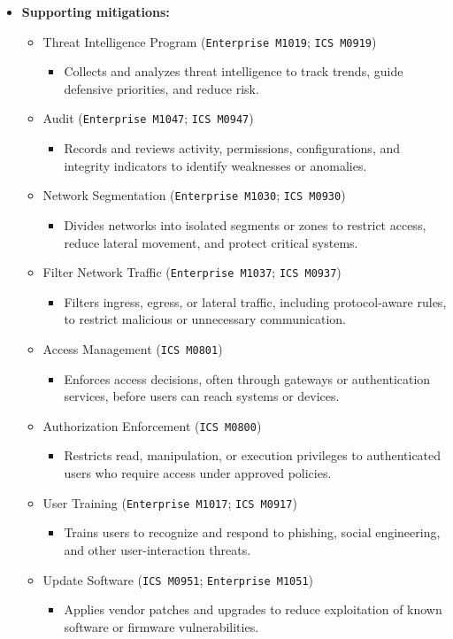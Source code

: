 \documentclass[10pt,a4paper,oneside]{report}
\begin{document}
\begin{itemize}
\item \textbf{Supporting mitigations:}
\begin{itemize}
\item Threat Intelligence Program (\texttt{Enterprise M1019}; \texttt{ICS M0919})
\begin{itemize}
\item Collects and analyzes threat intelligence to track trends, guide defensive priorities, and reduce risk.
\end{itemize}
\item Audit (\texttt{Enterprise M1047}; \texttt{ICS M0947})
\begin{itemize}
\item Records and reviews activity, permissions, configurations, and integrity indicators to identify weaknesses or anomalies.
\end{itemize}
\item Network Segmentation (\texttt{Enterprise M1030}; \texttt{ICS M0930})
\begin{itemize}
\item Divides networks into isolated segments or zones to restrict access, reduce lateral movement, and protect critical systems.
\end{itemize}
\item Filter Network Traffic (\texttt{Enterprise M1037}; \texttt{ICS M0937})
\begin{itemize}
\item Filters ingress, egress, or lateral traffic, including protocol-aware rules, to restrict malicious or unnecessary communication.
\end{itemize}
\item Access Management (\texttt{ICS M0801})
\begin{itemize}
\item Enforces access decisions, often through gateways or authentication services, before users can reach systems or devices.
\end{itemize}
\item Authorization Enforcement (\texttt{ICS M0800})
\begin{itemize}
\item Restricts read, manipulation, or execution privileges to authenticated users who require access under approved policies.
\end{itemize}
\item User Training (\texttt{Enterprise M1017}; \texttt{ICS M0917})
\begin{itemize}
\item Trains users to recognize and respond to phishing, social engineering, and other user-interaction threats.
\end{itemize}
\item Update Software (\texttt{ICS M0951}; \texttt{Enterprise M1051})
\begin{itemize}
\item Applies vendor patches and upgrades to reduce exploitation of known software or firmware vulnerabilities.
\end{itemize}
\end{itemize}
\end{itemize}
\end{document}
